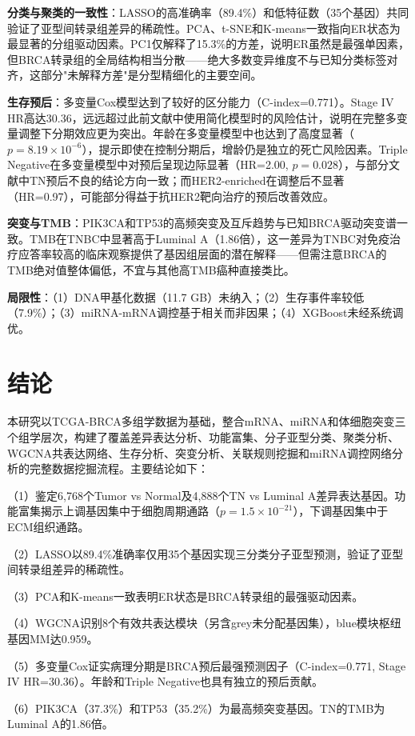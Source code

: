 \documentclass[12pt,a4paper,openany]{ctexbook}
\begin{document}
\textbf{分类与聚类的一致性}：LASSO的高准确率（89.4\%）和低特征数（35个基因）共同验证了亚型间转录组差异的稀疏性。PCA、t-SNE和K-means一致指向ER状态为最显著的分组驱动因素。PC1仅解释了15.3\%的方差，说明ER虽然是最强单因素，但BRCA转录组的全局结构相当分散——绝大多数变异维度不与已知分类标签对齐，这部分"未解释方差"是分型精细化的主要空间。

\textbf{生存预后}：多变量Cox模型达到了较好的区分能力（C-index=0.771）。Stage IV HR高达30.36，远远超过此前文献中使用简化模型时的风险估计，说明在完整多变量调整下分期效应更为突出。年龄在多变量模型中也达到了高度显著（$p=8.19\times10^{-6}$），提示即使在控制分期后，增龄仍是独立的死亡风险因素。Triple Negative在多变量模型中对预后呈现边际显著（HR=2.00, $p=0.028$），与部分文献中TN预后不良的结论方向一致；而HER2-enriched在调整后不显著（HR=0.97），可能部分得益于抗HER2靶向治疗的预后改善效应。

\textbf{突变与TMB}：PIK3CA和TP53的高频突变及互斥趋势与已知BRCA驱动突变谱一致。TMB在TNBC中显著高于Luminal A（1.86倍），这一差异为TNBC对免疫治疗应答率较高的临床观察提供了基因组层面的潜在解释——但需注意BRCA的TMB绝对值整体偏低，不宜与其他高TMB癌种直接类比。

\textbf{局限性}：（1）DNA甲基化数据（11.7 GB）未纳入；（2）生存事件率较低（7.9\%）；（3）miRNA-mRNA调控基于相关而非因果；（4）XGBoost未经系统调优。

\chapter{结论}
本研究以TCGA-BRCA多组学数据为基础，整合mRNA、miRNA和体细胞突变三个组学层次，构建了覆盖差异表达分析、功能富集、分子亚型分类、聚类分析、WGCNA共表达网络、生存分析、突变分析、关联规则挖掘和miRNA调控网络分析的完整数据挖掘流程。主要结论如下：

（1）鉴定6,768个Tumor vs Normal及4,888个TN vs Luminal A差异表达基因。功能富集揭示上调基因集中于细胞周期通路（$p=1.5\times10^{-21}$），下调基因集中于ECM组织通路。

（2）LASSO以89.4\%准确率仅用35个基因实现三分类分子亚型预测，验证了亚型间转录组差异的稀疏性。

（3）PCA和K-means一致表明ER状态是BRCA转录组的最强驱动因素。

（4）WGCNA识别8个有效共表达模块（另含grey未分配基因集），blue模块枢纽基因MM达0.959。

（5）多变量Cox证实病理分期是BRCA预后最强预测因子（C-index=0.771, Stage IV HR=30.36）。年龄和Triple Negative也具有独立的预后贡献。

（6）PIK3CA（37.3\%）和TP53（35.2\%）为最高频突变基因。TN的TMB为Luminal A的1.86倍。
\end{document}
